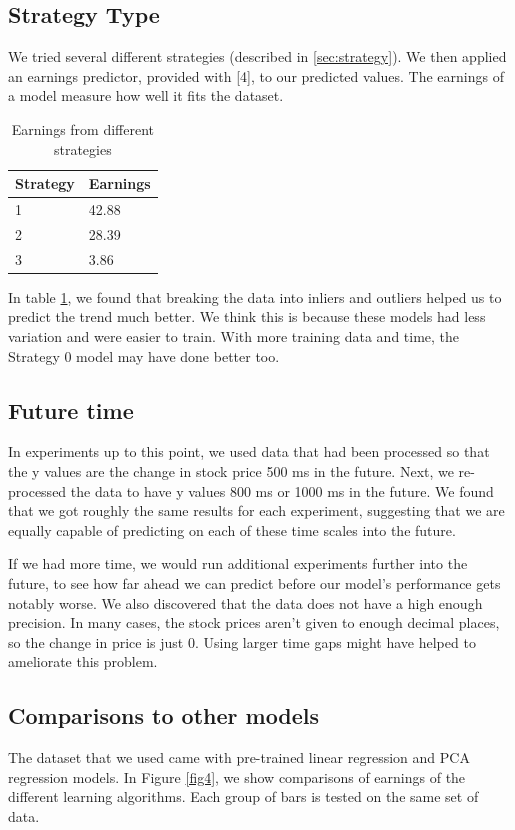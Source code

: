 \documentclass{article} %
\begin{document}
\subsection{Strategy Type}
We tried several different strategies (described in \ref{sec:strategy}).
We then applied an earnings predictor, provided with [4], to our predicted values.
The earnings of a model measure how well it fits the dataset.
\begin{table}[h]
	\label{t}
	\centering
	\caption{Earnings from different strategies}
	\begin{tabular}{| l | l |}
	\hline
	Strategy & Earnings \\
	\hline
	1 & 42.88 \\
	2 & 28.39 \\
	3 & 3.86 \\
	\hline
	\end{tabular}
\end{table}

In table \ref{t}, we found that breaking the data into inliers and outliers helped us to predict the trend much better.
We think this is because these models had less variation and were easier to train.
With more training data and time, the Strategy 0 model may have done better too.


\subsection{Future time}
In experiments up to this point, we used data that had been processed so that the y values are the change in stock price 500 ms in the future.
Next, we re-processed the data to have y values 800 ms or 1000 ms in the future.
We found that we got roughly the same results for each experiment, suggesting that we are equally capable of predicting on each of these time scales into the future.

If we had more time, we would run additional experiments further into the future, to see how far ahead we can predict before our model's performance gets notably worse.
We also discovered that the data does not have a high enough precision.  In many cases, the stock prices aren't given to enough decimal places, so the change in price is just 0.
Using larger time gaps might have helped to ameliorate this problem.


\subsection{Comparisons to other models}
The dataset that we used came with pre-trained linear regression and PCA regression models.
In Figure \ref{fig4}, we show comparisons of earnings of the different learning algorithms.  Each group of bars is tested on the same set of data.
\end{document}
